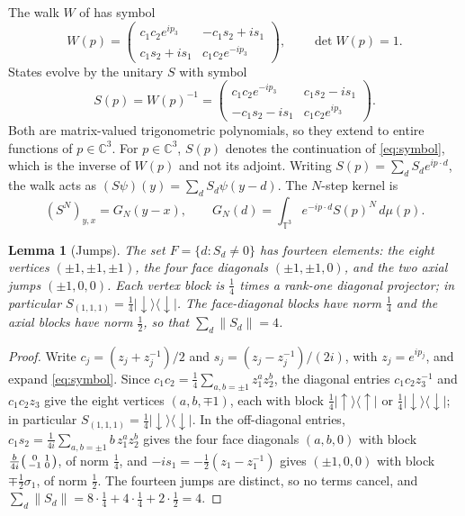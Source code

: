 \documentclass[11pt]{amsart}
\newtheorem{lemma}[theorem]{Lemma}
\theoremstyle{definition}
\theoremstyle{remark}
\newcommand{\C}{\mathbb{C}}
\newcommand{\T}{\mathbb{T}}
\newcommand{\up}{{\uparrow}}
\newcommand{\dn}{{\downarrow}}
\begin{document}
The walk $W$ of \cite[Eq.~(5.15)]{CJWW} has symbol
\[
W(p)=\begin{pmatrix} c_1c_2e^{ip_3} & -c_1s_2+is_1\\ c_1s_2+is_1 & c_1c_2e^{-ip_3}\end{pmatrix},
\qquad \det W(p)=1 .
\]
States evolve by the unitary $S$ with symbol
\begin{equation}\label{eq:symbol}
S(p)=W(p)^{-1}=\begin{pmatrix} c_1c_2e^{-ip_3} & c_1s_2-is_1\\ -c_1s_2-is_1 & c_1c_2e^{ip_3}\end{pmatrix}.
\end{equation}
Both are matrix-valued trigonometric polynomials, so they extend to entire
functions of $p\in\C^3$.  For $p\in\C^3$, $S(p)$ denotes the continuation of
\eqref{eq:symbol}, which is the inverse of $W(p)$ and not its adjoint.
Writing $S(p)=\sum_dS_de^{ip\cdot d}$, the walk acts as
$(S\psi)(y)=\sum_dS_d\psi(y-d)$.  The $N$-step kernel is
\begin{equation}\label{eq:kernel}
(S^N)_{y,x}=G_N(y-x),\qquad G_N(d)=\int_{\T^3}e^{-ip\cdot d}S(p)^N\,d\mu(p).
\end{equation}

\begin{lemma}[Jumps]\label{lem:jumps}
The set $F=\{d:S_d\ne0\}$ has fourteen elements: the eight vertices
$(\pm1,\pm1,\pm1)$, the four face diagonals $(\pm1,\pm1,0)$, and the two
axial jumps $(\pm1,0,0)$.  Each vertex block is $\frac14$ times a rank-one
diagonal projector; in particular $S_{(1,1,1)}=\frac14|\dn\rangle\langle\dn|$.
The face-diagonal blocks have norm $\frac14$ and the axial blocks have norm
$\frac12$, so that $\sum_d\|S_d\|=4$.
\end{lemma}

\begin{proof}
Write $c_j=(z_j+z_j^{-1})/2$ and $s_j=(z_j-z_j^{-1})/(2i)$, with
$z_j=e^{ip_j}$, and expand \eqref{eq:symbol}.  Since $c_1c_2=\frac14\sum_{a,b=\pm1}z_1^az_2^b$,
the diagonal entries $c_1c_2z_3^{-1}$ and $c_1c_2z_3$ give the eight
vertices $(a,b,\mp1)$, each with block $\frac14|\up\rangle\langle\up|$ or
$\frac14|\dn\rangle\langle\dn|$; in particular $S_{(1,1,1)}=\frac14|\dn\rangle\langle\dn|$.
In the off-diagonal entries, $c_1s_2=\frac1{4i}\sum_{a,b=\pm1}b\,z_1^az_2^b$ gives
the four face diagonals $(a,b,0)$ with block
$\frac{b}{4i}\begin{psmallmatrix}0&1\\-1&0\end{psmallmatrix}$, of norm
$\frac14$, and $-is_1=-\frac12(z_1-z_1^{-1})$ gives $(\pm1,0,0)$ with block
$\mp\frac12\sigma_1$, of norm $\frac12$.  The fourteen jumps are distinct, so
no terms cancel, and $\sum_d\|S_d\|=8\cdot\frac14+4\cdot\frac14+2\cdot\frac12=4$.
\end{proof}
\end{document}
